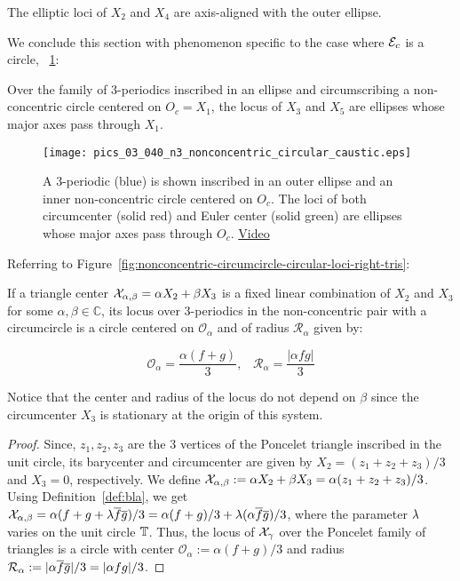 \begin{observation}\label{obs:X2X4}
The elliptic loci of $X_2$ and $X_4$ are axis-aligned with the outer ellipse.
\end{observation} 

We conclude this section with phenomenon specific to the case where $\mathcal{E}_c$ is a circle,  ~\cref{fig:circular-caustic}:

\begin{observation}
 Over the family of 3-periodics inscribed in an ellipse and circumscribing a non-concentric circle centered on $O_c=X_1$, the locus of $X_3$ and $X_5$ are ellipses whose major axes pass through $X_1$.
 \end{observation}
 
\begin{figure}
    \centering
    \texttt{[image: pics\_03\_040\_n3\_nonconcentric\_circular\_caustic.eps]}
    \caption{A 3-periodic (blue) is shown inscribed in an outer ellipse and an inner non-concentric circle centered on $O_c$. The loci of both circumcenter (solid red) and Euler center (solid green) are ellipses whose major axes pass through $O_c$. \href{https://youtu.be/w7sZ5O8k4xU}{Video}}
    \label{fig:circular-caustic}
\end{figure}



Referring to Figure~\ref{fig:nonconcentric-circumcircle-circular-loci-right-tris}:

\begin{proposition}
If a triangle center $\mathcal{X}_{\alpha,\beta}=\alpha X_2+ \beta X_3$ is a fixed linear combination of $X_2$ and $X_3$ for some $\alpha,\beta\in\mathbb{C}$, its locus over 3-periodics in the non-concentric pair with a circumcircle is a circle centered on $\mathcal{O}_\alpha$ and of radius $\mathcal{R}_\alpha$ given by:

\[ \mathcal{O}_\alpha = \frac{\alpha(f+g)}{3},\;\;\; \mathcal{R}_\alpha =\frac{|\alpha f g|}{3}\]
\label{prop:LinComb-concentric}
\end{proposition}

\begin{observation}
Notice that the center and radius of the locus do not depend on $\beta$ since the circumcenter $X_3$ is stationary at the origin of this system.
\end{observation}

\begin{proof}
Since, $z_1,z_2,z_3$ are the 3 vertices of the Poncelet triangle inscribed in the unit circle, its barycenter and circumcenter are given by $X_2=(z_1+z_2+z_3)/3$ and $X_3=0$, respectively. We define $\mathcal{X}_{\alpha,\beta}:=\alpha X_2+ \beta X_3=\alpha (z_1+z_2+z_3)/3$. Using Definition~\ref{def:bla}, we get $\mathcal{X}_{\alpha,\beta}=\alpha(f+g+\lambda \overline{f}\overline{g})/3=\alpha(f+g)/3+\lambda(\alpha \overline{f}\overline{g})/3$, where the parameter $\lambda$ varies on the unit circle $\mathbb{T}$. Thus, the locus of $\mathcal{X}_{\gamma}$ over the Poncelet family of triangles is a circle with center $\mathcal{O}_{\alpha}:=\alpha(f+g)/3$ and radius $\mathcal{R}_{\alpha}:=|\alpha \overline{f}\overline{g}|/3=|\alpha f g|/3$.
\end{proof}

